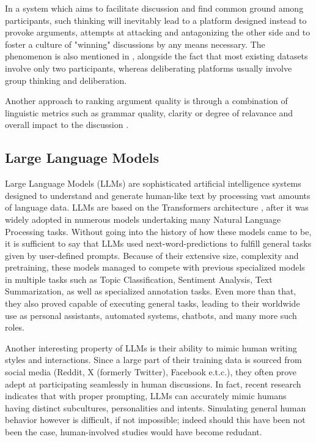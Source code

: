 In a system which aims to facilitate discussion and find common ground among participants, such thinking will inevitably lead to a platform designed instead to provoke arguments, attempts at attacking and antagonizing the other side and to foster a culture of "winning" discussions by any means necessary. The phenomenon is also mentioned in \cite{karadzhov2023delidata}, alongside the fact that most existing datasets involve only two participants, whereas deliberating platforms usually involve group thinking and deliberation. 

Another approach to ranking argument quality is through a combination of linguistic metrics such as grammar quality, clarity or degree of relavance and overall impact to the discussion \cite{Gretz2019ALD}.

\subsection{Large Language Models}
\label{sec:background:llm}

Large Language Models (LLMs) are sophisticated artificial intelligence systems designed to understand and generate human-like text by processing vast amounts of language data. LLMs are based on the Transformers architecture \cite{vaswani2023attentionneed}, after it was widely adopted in numerous models undertaking many Natural Language Processing tasks. Without going into the history of how these models came to be, it is sufficient to say that LLMs used next-word-predictions to fulfill general tasks given by user-defined prompts. Because of their extensive size, complexity and pretraining, these models managed to compete with  previous specialized models in multiple tasks such as Topic Classification, Sentiment Analysis, Text Summarization, as well as specialized annotation tasks.  Even more than that, they also proved capable of executing general tasks, leading to their worldwide use as personal assistants, automated systems, chatbots, and many more such roles. 

Another interesting property of LLMs is their ability to mimic human writing styles and interactions. Since a large part of their training data is sourced from social media (Reddit, X (formerly Twitter),  Facebook e.t.c.), they often prove adept at participating seamlessly in human discussions. In fact, recent research \cite{Vezhnevets2023GenerativeAM, aher2023usinglargelanguagemodels} indicates that with proper prompting, LLMs can accurately mimic humans having distinct subcultures, personalities and intents. Simulating general human behavior however is difficult, if not impossible; indeed should this have been not been the case, human-involved studies would have become redudant.

